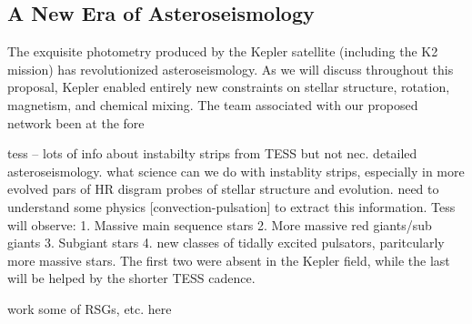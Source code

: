 {\color{blue}
\subsection{A New Era of Asteroseismology}

The exquisite photometry produced by the Kepler satellite (including the K2 mission) has revolutionized asteroseismology.   As we will discuss throughout this proposal, Kepler enabled entirely new constraints on stellar structure, rotation, magnetism, and chemical mixing.   The team associated with our proposed network been at the fore

tess -- lots of info about instabilty strips from TESS but not nec. detailed asteroseismology.  what science can we do with instablity strips, especially in more evolved pars of HR disgram  probes of stellar structure and evolution.   need to understand some physics [convection-pulsation] to extract this information.   Tess will observe: 1. Massive main sequence stars 2. More massive red giants/sub giants 3. Subgiant stars 4.  new classes of tidally excited pulsators, paritcularly more massive stars.   The first two were absent in the Kepler field, while the last will be helped by the shorter TESS cadence.

work some of RSGs, etc. here




}